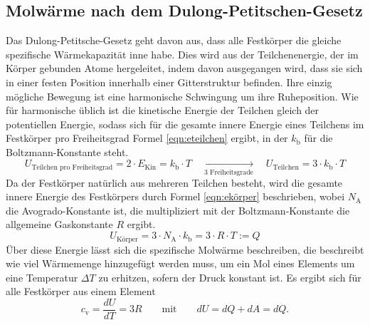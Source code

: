 \documentclass[titlepage = firstcover]{scrartcl}
\begin{document}
        \subsection{Molwärme nach dem Dulong-Petitschen-Gesetz}
            Das Dulong-Petitsche-Gesetz geht davon aus, dass alle Festkörper die gleiche spezifische Wärmekapazität inne habe. Dies wird aus der
            Teilchenenergie, der im Körper gebunden Atome hergeleitet, indem davon ausgegangen wird, dass sie sich in einer festen Position
            innerhalb einer Gitterstruktur befinden. Ihre einzig mögliche Bewegung ist eine harmonische Schwingung um ihre Ruheposition. Wie für
            harmonische üblich ist die kinetische Energie der Teilchen gleich der potentiellen Energie, sodass sich für die gesamte innere Energie eines 
            Teilchens im Festkörper pro Freiheitsgrad Formel \eqref{eqn:eteilchen} ergibt, in der $k_{\text{b}}$ für die Boltzmann-Konstante steht.
            \begin{equation}
                U_{\text{Teilchen pro Freiheitsgrad}} = 2 \cdot E_{\text{Kin}} = k_{\text{b}} \cdot T \quad \xrightarrow[\text{3 Freiheitsgrade}]{} \quad U_{\text{Teilchen}} = 3 \cdot k_{\text{b}} \cdot T
                \label{eqn:eteilchen}
            \end{equation} 
            Da der Festkörper natürlich aus mehreren Teilchen besteht, wird die gesamte innere Energie des Festkörpers durch Formel \eqref{eqn:ekörper} beschrieben, 
            wobei $N_{\text{A}}$ die Avogrado-Konstante ist, die multipliziert mit der Boltzmann-Konstante die allgemeine Gaskonstante $R$ ergibt. 
            \begin{equation}
                U_{\text{Körper}} = 3 \cdot N_{\text{A}} \cdot k_{\text{b}} = 3 \cdot R \cdot T := Q
                \label{eqn:ekörper}
            \end{equation}
            Über diese Energie lässt sich die spezifische Molwärme beschreiben, die beschreibt wie viel Wärmemenge hinzugefügt werden muss, um ein Mol eines
            Elements um eine Temperatur $\Delta T$ zu erhitzen, sofern der Druck konstant ist. Es ergibt sich für alle Festkörper aus einem Element
            \begin{equation}
                c_{\text{v}} = \frac{dU}{dT} = 3R \qquad \text{mit} \qquad dU = dQ + dA = dQ .
            \end{equation}
            
\end{document}
